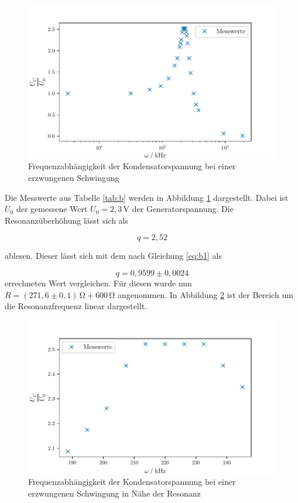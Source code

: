 \begin{figure}[H]
  \centering
  \includegraphics{build/plot2.pdf}
  \caption{Frequenzabhängigkeit der Kondensatorspannung bei einer erzwungenen Schwingung}
  \label{fig:c}
\end{figure}


\noindent Die Messwerte aus Tabelle \ref{tab:b} werden
in Abbildung \ref{fig:c} dargestellt. Dabei ist $U_0$ 
der gemessene Wert $U_0=2,3\,\si{\volt} $ der Generatorspannung. Die Resonanzüberhöhung
lässt sich als

\begin{equation*}
  q=2,52
\end{equation*}

\noindent ablesen. Dieser lässt sich mit dem nach Gleichung
\ref{eq:b1} als 

\begin{equation*}
  q=0,9599\pm0,0024
\end{equation*}
\noindent errechneten Wert vergleichen. Für diesen wurde
nun $R=(271,6\pm0,1)\,\si{\ohm} + 600\,\si{\ohm}$ angenommen.
In Abbildung \ref{fig:g} ist der Bereich
um die Resonanzfrequenz linear dargestellt.
\begin{figure}[H]
  \centering
  \includegraphics{build/plot3.pdf}
  \caption{Frequenzabhängigkeit der Kondensatorspannung bei einer erzwungenen Schwingung in Nähe der Resonanz}
  \label{fig:g}
\end{figure}



